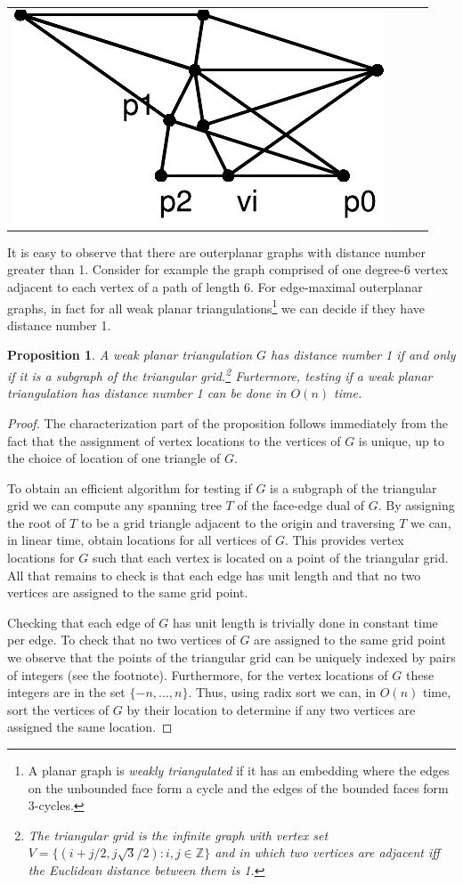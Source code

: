 \documentclass{article}
\newtheorem{prop}{Proposition}
\begin{document}
\begin{tabular}{cccc}
\includegraphics[scale=.30]{no2-4} 
\end{tabular}

It is easy to observe that there are outerplanar graphs with distance
number greater than 1.  Consider for example the graph comprised of
one degree-6 vertex adjacent to each vertex of a path of length 6. For
edge-maximal outerplanar graphs, in fact for all weak planar
triangulations\footnote{A planar graph is \emph{weakly triangulated}
if it has an embedding where the edges on the unbounded face form a
cycle and the edges of the bounded faces form 3-cycles.} we can decide
if they have distance number 1.

\begin{prop} A weak planar triangulation $G$ has distance number 1 if
and only if it is a subgraph of the triangular grid.\footnote{The
triangular grid is the infinite graph with vertex set 
$V=\{(i+j/2,j\sqrt{3}/2): i,j\in\mathbb{Z}\}$ and in which two vertices are
adjacent iff the Euclidean distance between them is 1.}  Furtermore,
testing if a weak planar triangulation has distance number 1 can be
done in $O(n)$ time.  \end{prop}

\begin{proof}
The characterization part of the proposition follows immediately from
the fact that the assignment of vertex locations to the vertices of
$G$ is unique, up to the choice of location of one triangle of $G$.

To obtain an efficient algorithm for testing if $G$ is a subgraph of
the triangular grid  we can compute any spanning tree $T$ of the
face-edge dual of $G$.  By assigning the root of $T$ to be a grid
triangle adjacent to the origin and traversing $T$ we can, in linear
time, obtain locations for all vertices of $G$.  This provides vertex
locations for $G$ such that each vertex is located on a point of the
triangular grid.  All that remains to check is that each edge has unit
length and that no two vertices are assigned to the same grid point.

Checking that each edge of $G$ has unit length is trivially done in
constant time per edge.  To check that no two vertices of $G$ are
assigned to the same grid point we observe that the points of the
triangular grid can be uniquely indexed by pairs of integers (see the
footnote).  Furthermore, for the vertex locations of $G$ these
integers are in the set $\{-n,\ldots,n\}$.  Thus, using radix sort we
can, in $O(n)$ time, sort the vertices of $G$ by their location to
determine if any two vertices are assigned the same location.
\end{proof}
\end{document}

